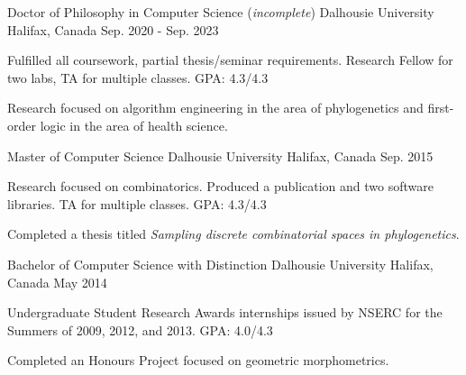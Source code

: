 

\begin{cventries}

   \cventry
    {Doctor of Philosophy in Computer Science (\textit{incomplete})} %
    {Dalhousie University} %
    {Halifax, Canada} %
    {Sep. 2020 - Sep. 2023} %
    {
      \begin{cvitems} %
        \item {Fulfilled all coursework, partial thesis/seminar requirements. Research Fellow for two labs, TA for multiple classes. GPA: 4.3/4.3}
        \item {Research focused on algorithm engineering in the area of phylogenetics and first-order logic in the area of health science.}
      \end{cvitems}
    }

  \cventry
    {Master of Computer Science} %
    {Dalhousie University} %
    {Halifax, Canada} %
    {Sep. 2015} %
    {
      \begin{cvitems} %
        \item {Research focused on combinatorics. Produced a publication and two software libraries. TA for multiple classes. GPA: 4.3/4.3}
        \item {Completed a thesis titled \textit{Sampling discrete combinatorial spaces in phylogenetics}.}
      \end{cvitems}
    }
 
   \cventry
    {Bachelor of Computer Science with Distinction} %
    {Dalhousie University} %
    {Halifax, Canada} %
    {May 2014} %
    {
      \begin{cvitems} %
        \item {Undergraduate Student Research Awards internships issued by NSERC for the Summers of 2009, 2012, and 2013. GPA: 4.0/4.3}
        \item {Completed an Honours Project focused on geometric morphometrics.}
      \end{cvitems}
    }

\end{cventries}
